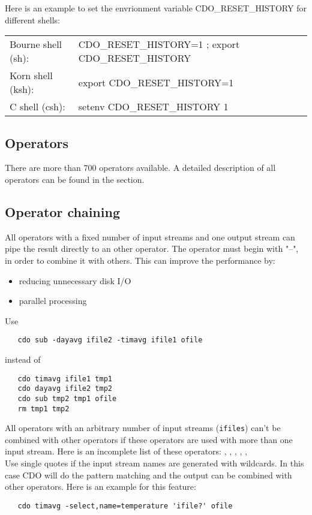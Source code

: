 Here is an example to set the envrionment variable CDO\_RESET\_HISTORY for different shells:

\begin{tabular}[b]{ll}
Bourne shell (sh): & CDO\_RESET\_HISTORY=1 ; export CDO\_RESET\_HISTORY \\
Korn shell (ksh):   & export CDO\_RESET\_HISTORY=1 \\
C shell (csh):        & setenv CDO\_RESET\_HISTORY 1 \\
\end{tabular}


\subsection{Operators}

There are more than 700 operators available.
A detailed description of all operators can be found in the
{\bf {}} section.


\subsection{Operator chaining}

All operators with a fixed number of input streams and one output stream
can pipe the result directly to an other operator.
The operator must begin with "--", in order to combine it with others.
This can improve the performance by:
\begin{itemize}
\item reducing unnecessary disk I/O
\item parallel processing
\end{itemize}
Use
\begin{verbatim}
   cdo sub -dayavg ifile2 -timavg ifile1 ofile
\end{verbatim}
instead of
\begin{verbatim}
   cdo timavg ifile1 tmp1
   cdo dayavg ifile2 tmp2
   cdo sub tmp2 tmp1 ofile
   rm tmp1 tmp2
\end{verbatim}

All operators with an arbitrary number of input streams ({\tt ifiles})
can't be combined with other operators if these operators are used
with more than one input stream. Here is an incomplete list of
these operators:
{\bf {}},
{\bf {}},
{\bf {}},
{\bf {}},
{\bf {}},
{\bf {}} \\
Use single quotes if the input stream names are generated with
wildcards. In this case CDO will do the pattern matching and the
output can be combined with other operators. Here is an example for
this feature:
\begin{verbatim}
   cdo timavg -select,name=temperature 'ifile?' ofile
\end{verbatim}

